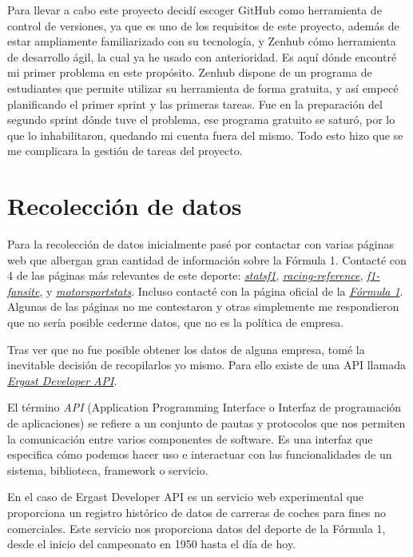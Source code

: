 Para llevar a cabo este proyecto decidí escoger GitHub como herramienta de control de versiones, ya que es uno de los requisitos de este proyecto, además de estar ampliamente familiarizado con su tecnología, y Zenhub cómo herramienta de desarrollo ágil, la cual ya he usado con anterioridad. Es aquí dónde encontré mi primer problema en este propósito. Zenhub dispone de un programa de estudiantes que permite utilizar su herramienta de forma gratuita, y así empecé planificando el primer sprint y las primeras tareas. Fue en la preparación del segundo sprint dónde tuve el problema, ese programa gratuito se saturó, por lo que lo inhabilitaron, quedando mi cuenta fuera del mismo. Todo esto hizo que se me complicara la gestión de tareas del proyecto.

\section{Recolección de datos}

Para la recolección de datos inicialmente pasé por contactar con varias páginas web que albergan gran cantidad de información sobre la Fórmula 1. Contacté con 4 de las páginas más relevantes de este deporte: \href{https://www.statsf1.com/}{\textit{statsf1}}, \href{https://www.racing-reference.info/}{\textit{racing-reference}}, \href{https://www.f1-fansite.com/}{\textit{f1-fansite}}, y \href{https://www.motorsportstats.com/}{\textit{motorsportstats}}. Incluso contacté con la página oficial de la \href{https://www.formula1.com/}{\textit{Fórmula 1}}. Algunas de las páginas no me contestaron y otras simplemente me respondieron que no sería posible cederme datos, que no es la política de empresa. 

Tras ver que no fue posible obtener los datos de alguna empresa, tomé la inevitable decisión de recopilarlos yo mismo. Para ello existe de una API llamada \href{https://ergast.com/mrd/}{\textit{Ergast Developer API}}. 

El término \textit{API} (Application Programming Interface o Interfaz de programación de aplicaciones) se refiere a un conjunto de pautas y protocolos que nos permiten la comunicación entre varios componentes de software. Es una interfaz que especifica cómo podemos hacer uso e interactuar con las funcionalidades de un sistema, biblioteca, framework o servicio. 

En el caso de Ergast Developer API es un servicio web experimental que proporciona un registro histórico de datos de carreras de coches para fines no comerciales\cite{eargast:API}. Este servicio nos proporciona datos del deporte de la Fórmula 1, desde el inicio del campeonato en 1950 hasta el día de hoy.

